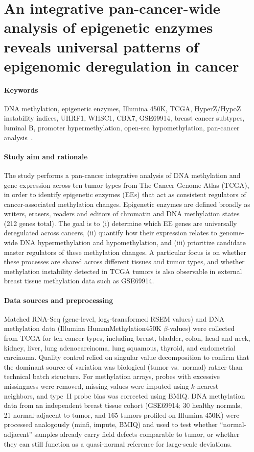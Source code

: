 \documentclass[10pt]{extarticle}
\begin{document}
\section{An integrative pan-cancer-wide analysis of epigenetic enzymes reveals universal patterns of epigenomic deregulation in cancer}

\paragraph{Keywords}
DNA methylation, epigenetic enzymes, Illumina 450K, TCGA, HyperZ/HypoZ instability indices, UHRF1, WHSC1, CBX7, GSE69914, breast cancer subtypes, luminal B, promoter hypermethylation, open-sea hypomethylation, pan-cancer analysis~\cite{yang2015integrative}.

\paragraph{Study aim and rationale}
The study performs a pan-cancer integrative analysis of DNA methylation and gene expression across ten tumor types from The Cancer Genome Atlas (TCGA), in order to identify epigenetic enzymes (EEs) that act as consistent regulators of cancer-associated methylation changes. Epigenetic enzymes are defined broadly as writers, erasers, readers and editors of chromatin and DNA methylation states (212 genes total). The goal is to (i) determine which EE genes are universally deregulated across cancers, (ii) quantify how their expression relates to genome-wide DNA hypermethylation and hypomethylation, and (iii) prioritize candidate master regulators of these methylation changes. A particular focus is on whether these processes are shared across different tissues and tumor types, and whether methylation instability detected in TCGA tumors is also observable in external breast tissue methylation data such as GSE69914.

\paragraph{Data sources and preprocessing}
Matched RNA-Seq (gene-level, log$_2$-transformed RSEM values) and DNA methylation data (Illumina HumanMethylation450K $\beta$-values) were collected from TCGA for ten cancer types, including breast, bladder, colon, head and neck, kidney, liver, lung adenocarcinoma, lung squamous, thyroid, and endometrial carcinoma. Quality control relied on singular value decomposition to confirm that the dominant source of variation was biological (tumor vs.\ normal) rather than technical batch structure. For methylation arrays, probes with excessive missingness were removed, missing values were imputed using $k$-nearest neighbors, and type~II probe bias was corrected using BMIQ. DNA methylation data from an independent breast tissue cohort (GSE69914; 30 healthy normals, 21 normal-adjacent to tumor, and 165 tumors profiled on Illumina 450K) were processed analogously (minfi, impute, BMIQ) and used to test whether ``normal-adjacent'' samples already carry field defects comparable to tumor, or whether they can still function as a quasi-normal reference for large-scale deviations.
\end{document}
